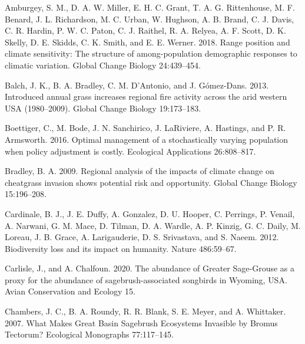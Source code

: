 \documentclass[
  12pt,
]{article}
\newlength{\cslhangindent}
\newenvironment{CSLReferences}[2] %
 {%
  \setlength{\parindent}{0pt}
  \ifodd #1 \everypar{\setlength{\hangindent}{\cslhangindent}}\ignorespaces\fi
  \ifnum #2 > 0
  \setlength{\parskip}{#2\baselineskip}
  \fi
 }%
 {}
\begin{document}
\hypertarget{refs}{}
\begin{CSLReferences}{1}{0}
\leavevmode{}%
Amburgey, S. M., D. A. W. Miller, E. H. C. Grant, T. A. G. Rittenhouse, M. F. Benard, J. L. Richardson, M. C. Urban, W. Hughson, A. B. Brand, C. J. Davis, C. R. Hardin, P. W. C. Paton, C. J. Raithel, R. A. Relyea, A. F. Scott, D. K. Skelly, D. E. Skidds, C. K. Smith, and E. E. Werner. 2018. Range position and climate sensitivity: {The} structure of among-population demographic responses to climatic variation. Global Change Biology 24:439--454.

\leavevmode{}%
Balch, J. K., B. A. Bradley, C. M. D'Antonio, and J. Gómez-Dans. 2013. Introduced annual grass increases regional fire activity across the arid western {USA} (1980--2009). Global Change Biology 19:173--183.

\leavevmode{}%
Boettiger, C., M. Bode, J. N. Sanchirico, J. LaRiviere, A. Hastings, and P. R. Armsworth. 2016. Optimal management of a stochastically varying population when policy adjustment is costly. Ecological Applications 26:808--817.

\leavevmode{}%
Bradley, B. A. 2009. Regional analysis of the impacts of climate change on cheatgrass invasion shows potential risk and opportunity. Global Change Biology 15:196--208.

\leavevmode{}%
Cardinale, B. J., J. E. Duffy, A. Gonzalez, D. U. Hooper, C. Perrings, P. Venail, A. Narwani, G. M. Mace, D. Tilman, D. A. Wardle, A. P. Kinzig, G. C. Daily, M. Loreau, J. B. Grace, A. Larigauderie, D. S. Srivastava, and S. Naeem. 2012. Biodiversity loss and its impact on humanity. Nature 486:59--67.

\leavevmode{}%
Carlisle, J., and A. Chalfoun. 2020. The abundance of {Greater} {Sage}-{Grouse} as a proxy for the abundance of sagebrush-associated songbirds in {Wyoming}, {USA}. Avian Conservation and Ecology 15.

\leavevmode{}%
Chambers, J. C., B. A. Roundy, R. R. Blank, S. E. Meyer, and A. Whittaker. 2007. What {Makes} {Great} {Basin} {Sagebrush} {Ecosystems} {Invasible} by {Bromus} {Tectorum}? Ecological Monographs 77:117--145.


\end{CSLReferences}
\end{document}
